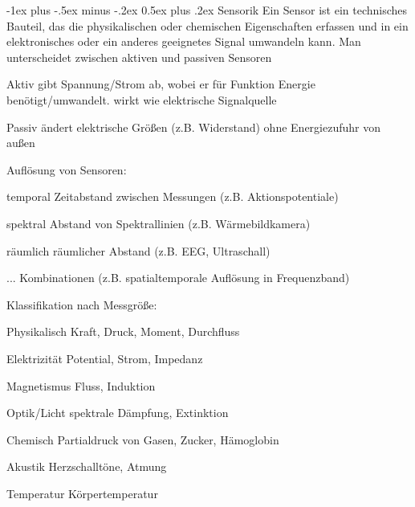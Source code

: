 \documentclass[a4paper]{article}
\makeatletter
\renewcommand{\section}{\@startsection{section}{1}{0mm}%
 {-1ex plus -.5ex minus -.2ex}%
 {0.5ex plus .2ex}%
 {\normalfont\large\bfseries}}
\makeatother
\begin{document}
\raggedright
\begin{multicols}{3}\scriptsize
  \setlength{\premulticols}{1pt}
  \setlength{\postmulticols}{1pt}
  \setlength{\multicolsep}{1pt}
  \setlength{\columnsep}{2pt}

  \section{Sensorik}
  Ein Sensor ist ein technisches Bauteil, das die physikalischen oder chemischen Eigenschaften erfassen und in ein elektronisches oder ein anderes geeignetes Signal umwandeln kann.
  Man unterscheidet zwischen aktiven und passiven Sensoren
  \begin{description*}
    \item[Aktiv] gibt Spannung/Strom ab, wobei er für Funktion Energie benötigt/umwandelt. wirkt wie elektrische Signalquelle
    \item[Passiv] ändert elektrische Größen (z.B. Widerstand) ohne Energiezufuhr von außen
  \end{description*}

  Auflösung von Sensoren:
  \begin{description*}
    \item[temporal] Zeitabstand zwischen Messungen (z.B. Aktionspotentiale)
    \item[spektral] Abstand von Spektrallinien (z.B. Wärmebildkamera)
    \item[räumlich] räumlicher Abstand (z.B. EEG, Ultraschall)
    \item[...] Kombinationen (z.B. spatialtemporale Auflösung in Frequenzband)
  \end{description*}

  Klassifikation nach Messgröße:
  \begin{description*}
    \item[Physikalisch] Kraft, Druck, Moment, Durchfluss
    \item[Elektrizität] Potential, Strom, Impedanz
    \item[Magnetismus] Fluss, Induktion
    \item[Optik/Licht] spektrale Dämpfung, Extinktion
    \item[Chemisch] Partialdruck von Gasen, Zucker, Hämoglobin
    \item[Akustik] Herzschalltöne, Atmung
    \item[Temperatur] Körpertemperatur
  \end{description*}


\end{multicols}
\end{document}
